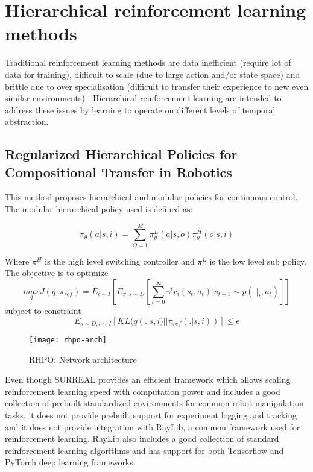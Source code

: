 \section{Hierarchical reinforcement learning methods}
Traditional reinforcement learning methods are data inefficient (require lot of data for training), difficult to scale (due to large action and/or state space) and brittle due to over specialisation (difficult to transfer their experience to new even similar environments) \cite{gradient}. Hierarchical reinforcement learning are intended to address these issues by learning to operate on different levels of temporal abstraction.

\subsection{Regularized Hierarchical Policies for Compositional Transfer in Robotics}
This method proposes \cite{wulfmeier2019regularized} hierarchical and modular policies for continuous control. The modular hierarchical policy used is defined as:

\begin{equation}
\pi_{\theta} (a | s, i) = \sum_{O=1}^{M} \pi_{\theta}^L(a | s, o) \pi_{\theta}^H(o | s, i)
\end{equation}

Where $\pi^H$ is the high level switching controller and $\pi^L$ is the low level sub policy. The objective is to optimize
\begin{equation}
\underset{q}{max} J(q, \pi_{ref}) = E_{i \sim I} \left[ E_{\pi, s \sim D} \left[ \sum_{t=0}^{\infty} \gamma^t r_i(s_t, a_t) | s_{t+1} \sim p(.|_t, a_t) \right] \right]
\end{equation}
subject to constraint
\begin{equation}
E_{s \sim D, i \sim I} \left[ KL(q(. | s, i) || \pi_{ref}(. | s, i)) \right] \leq \epsilon
\end{equation}

\begin{figure}[H]
	\centering
	\texttt{[image: rhpo-arch]}
	\caption{RHPO: Network architecture}
\end{figure}

Even though SURREAL provides an efficient framework which allows scaling reinforcement learning speed with computation power and includes a good collection of prebuilt standardized environments for common robot manipulation tasks, it does not provide prebuilt support for experiment logging and tracking and it does not provide integration with RayLib, a common framework used for reinforcement learning. RayLib also includes a good collection of standard reinforcement learning algorithms and has support for both Tensorflow and PyTorch deep learning frameworks. 